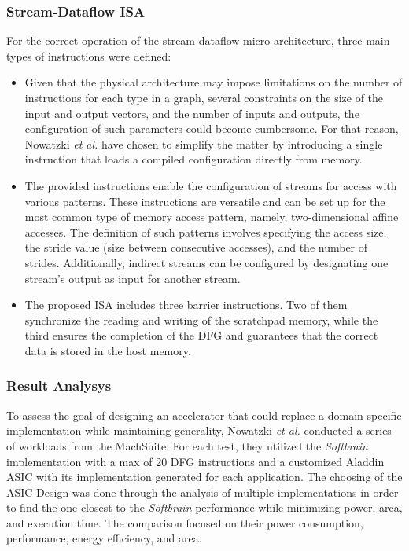 \subsubsection{Stream-Dataflow ISA}
For the correct operation of the stream-dataflow micro-architecture, three main types of instructions were defined:
\begin{itemize}
    \item[]  Given that the physical architecture may impose limitations on the number of instructions for each type in a graph, several constraints on the size of the input and output vectors, and the number of inputs and outputs, the configuration of such parameters could become cumbersome. For that reason, Nowatzki \textit{et al.} \cite{8192490} have chosen to simplify the matter by introducing a single instruction that loads a compiled configuration directly from memory.
    
    \item[]  The provided instructions enable the configuration of streams for access with various patterns. These instructions are versatile and can be set up for the most common type of memory access pattern, namely, two-dimensional affine accesses. The definition of such patterns involves specifying the access size, the stride value (size between consecutive accesses), and the number of strides. Additionally, indirect streams can be configured by designating one stream's output as input for another stream.
    
    \item[]  The proposed \acrfull{ISA} includes three barrier instructions. Two of them synchronize the reading and writing of the scratchpad memory, while the third ensures the completion of the \acrfull{DFG} and guarantees that the correct data is stored in the host memory.
\end{itemize}

\subsubsection{Result Analysys}

To assess the goal of designing an accelerator that could replace a domain-specific implementation while maintaining generality, Nowatzki \textit{et al.} \cite{8192490} conducted a series of workloads from the MachSuite. For each test, they utilized the \textit{Softbrain} implementation with a max of 20 DFG instructions and a customized Aladdin ASIC with its implementation generated for each application. The choosing of the ASIC Design was done through the analysis of multiple implementations in order to find the one closest to the \textit{Softbrain} performance while minimizing power, area, and execution time.
The comparison focused on their power consumption, performance, energy efficiency, and area.


